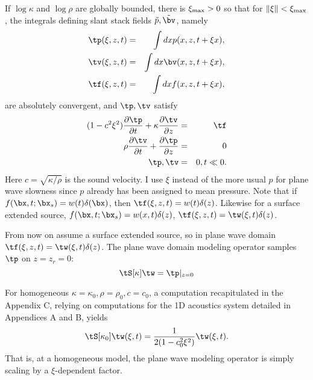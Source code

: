  If $\log \kappa$ and $\log \rho$ are globally
bounded, there is $\xi_{\rm max} > 0$ so that for $\|\xi\|<\xi_{\rm
  max}$, the integrals defining slant stack fields
$\tilde{p},\tilde{\bv}$, namely
\begin{eqnarray}
\label{eqn:slant}
\tp(\xi,z,t)& = &\int dx p(x,z,t+\xi x),\nonumber\\
\tv(\xi,z,t)&=&\int dx \bv(x,z,t+\xi x),\nonumber\\
\tf(\xi,z,t)&=&\int dx f(x,z,t+\xi x),
\end{eqnarray}
are absolutely convergent, and $\tp, \tv$ satisfy 
\begin{eqnarray}
\label{eqn:awepw}
(1-c^2\xi^2)\frac{\partial \tp}{\partial t} + \kappa\frac{\partial
  \tv}{\partial z} &=& \tf \nonumber\\
\rho \frac{\partial \tv}{\partial t} + \frac{\partial \tp}{\partial
  z}&=&0\nonumber\\
\tp,\tv&=&0, t \ll 0.
\end{eqnarray}
Here $c=\sqrt{\kappa/\rho}$ is the sound velocity. I use $\xi$ instead
of the more usual $p$ for plane wave slowness since $p$ already has
been assigned to mean pressure. Note that if
$f(\bx,t;\bx_s)=w(t)\delta(\bx)$, then
$\tf(\xi,z,t)=w(t)\delta(z)$. Likewise for a surface extended source,
$f(\bx,t;\bx_s) = w(x,t)\delta(z)$, $\tf(\xi,z,t) = \tw(\xi,t)\delta(z)$.

From now on assume a surface extended source, so in plane wave domain
$\tf(\xi,z,t) = \tw(\xi,t)\delta(z)$. The plane wave domain modeling
operator samples $\tp$ on $z=z_r=0$:
\begin{equation}
\label{eqn:modpw}
\tS[\kappa]\tw = \tp|_{z=0}
\end{equation}

For homogeneous $\kappa=\kappa_0, \rho=\rho_0, c=c_0$, a computation
recapitulated in the Appendix C, relying on computations for the 1D
acoustics system detailed in Appendices A and B, yields
\begin{equation}
\label{eqn:modhom}
\tS[\kappa_0]\tw(\xi,t) = \frac{1}{2(1-c_0^2\xi^2)}\tw(\xi,t).
\end{equation}
That is, at a homogeneous model, the plane wave modeling operator is
simply scaling by a $\xi$-dependent factor.

